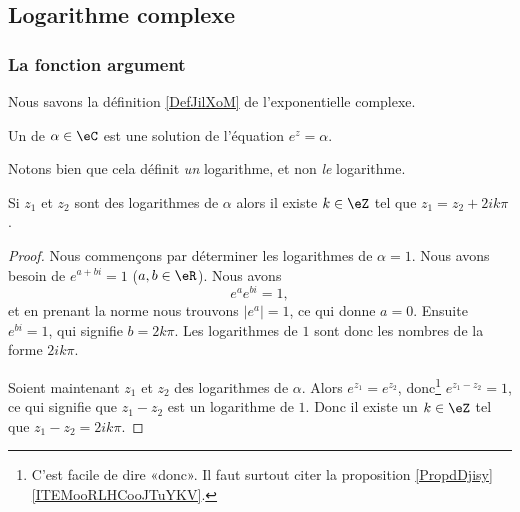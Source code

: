\subsection{Logarithme complexe}


\subsubsection{La fonction argument}

Nous savons la définition \ref{DefJilXoM} de l'exponentielle complexe.

\begin{definition}
    Un  de \( \alpha\in \eC\) est une solution de l'équation \(  e^{z}=\alpha\). 
\end{definition}
Notons bien que cela définit \emph{un} logarithme, et non \emph{le} logarithme. 

\begin{lemma}       \label{LEMooUMESooJVzeDb}
    Si \( z_1\) et \( z_2\) sont des logarithmes de \( \alpha\) alors il existe \( k\in \eZ\) tel que \( z_1=z_2+2ik\pi\).
\end{lemma}

\begin{proof}
    Nous commençons par déterminer les logarithmes de \( \alpha=1\). Nous avons besoin de \(  e^{a+bi}=1\) (\( a,b\in \eR\)). Nous avons
    \begin{equation}
        e^{a} e^{bi}=1,
    \end{equation}
    et en prenant la norme nous trouvons \( | e^a |=1\), ce qui donne \( a=0\). Ensuite \(  e^{bi}=1\), qui signifie \( b=2k\pi\). Les logarithmes de \( 1\) sont donc les nombres de la forme \( 2ik\pi\).

    Soient maintenant \( z_1\) et \( z_2\) des logarithmes de \( \alpha\). Alors \(  e^{z_1}= e^{z_2}\), donc\footnote{C'est facile de dire «donc». Il faut surtout citer la proposition \ref{PropdDjisy}\ref{ITEMooRLHCooJTuYKV}.} \(  e^{z_1-z_2}=1\), ce qui signifie que \( z_1-z_2\) est un logarithme de \( 1\). Donc il existe un \( k\in \eZ\) tel que \( z_1-z_2=2ik\pi\).
\end{proof}

